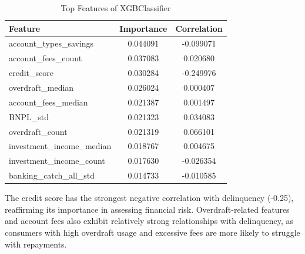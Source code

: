 \documentclass[12pt,letterpaper]{article}
\begin{document}
\begin{table}[H]
    \centering
    \begin{tabular}{|l|c|c|}
        \hline
        Feature & Importance & Correlation \\
        \hline
        account\_types\_savings & 0.044091 & -0.099071 \\
        account\_fees\_count & 0.037083 & 0.020680 \\
        credit\_score & 0.030284 & -0.249976 \\
        overdraft\_median & 0.026024 & 0.000407 \\
        account\_fees\_median & 0.021387 & 0.001497 \\
        BNPL\_std & 0.021323 & 0.034083 \\
        overdraft\_count & 0.021319 & 0.066101 \\
        investment\_income\_median & 0.018767 & 0.004675 \\
        investment\_income\_count & 0.017630 & -0.026354 \\
        banking\_catch\_all\_std & 0.014733 & -0.010585 \\
        \hline
    \end{tabular}
    \caption{Top Features of XGBClassifier}
    \label{tab:top_features_xgb}
\end{table}

The credit score has the strongest negative correlation with delinquency (-0.25), reaffirming its importance in assessing financial risk. Overdraft-related features and account fees also exhibit relatively strong relationships with delinquency, as consumers with high overdraft usage and excessive fees are more likely to struggle with repayments.
\end{document}
